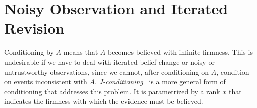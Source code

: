 \documentclass{llncs}
\begin{document}
\section{Noisy Observation and Iterated Revision}\label{sec:noisy}

Conditioning by $A$ means that $A$ becomes believed with infinite firmness.
This is undesirable if we have to deal with iterated belief change or noisy or untrustworthy observations,
	since we cannot, after conditioning on $A$, condition on events inconsistent with $A$.
\emph{J-conditioning}~\cite{goldszmidt1996qualitative} is a more general form of conditioning that addresses this problem.
It is parametrized by a rank $x$ that indicates the firmness with which the evidence must be believed.
\end{document}

